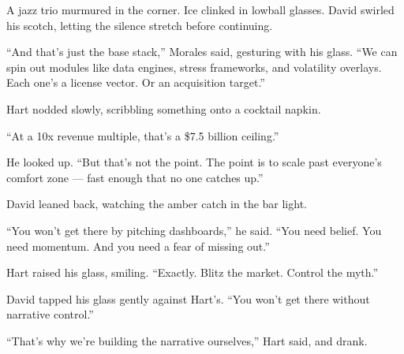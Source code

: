 A jazz trio murmured in the corner. Ice clinked in lowball glasses. David swirled his scotch, letting the silence stretch 
before continuing.

\medskip

``And that’s just the base stack,'' Morales said, gesturing with his glass.  
``We can spin out modules like data engines, stress frameworks, and volatility overlays.  
Each one’s a license vector. Or an acquisition target.''

Hart nodded slowly, scribbling something onto a cocktail napkin.

``At a 10x revenue multiple, that’s a \$7.5 billion ceiling.''

He looked up. ``But that’s not the point.  
The point is to scale past everyone’s comfort zone — fast enough that no one catches up.''

David leaned back, watching the amber catch in the bar light.

``You won’t get there by pitching dashboards,'' he said.  
``You need belief. You need momentum. And you need a fear of missing out.''

Hart raised his glass, smiling. ``Exactly. Blitz the market. Control the myth.''

David tapped his glass gently against Hart’s. ``You won’t get there without narrative control.''

``That’s why we’re building the narrative ourselves,'' Hart said, and drank.


\medskip

